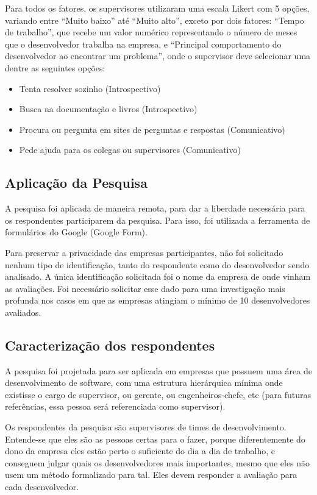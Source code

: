 Para todos os fatores, os supervisores utilizaram uma escala Likert com 5 opções, variando entre ``Muito baixo'' até ``Muito alto'', exceto por dois fatores: ``Tempo de trabalho'', que recebe um valor numérico representando o número de meses que o desenvolvedor trabalha na empresa, e ``Principal comportamento do desenvolvedor ao encontrar um problema'', onde o supervisor deve selecionar uma dentre as seguintes opções:

\begin{itemize}
	\item Tenta resolver sozinho (Introspectivo)
	\item Busca na documentação e livros (Introspectivo)
	\item Procura ou pergunta em sites de perguntas e respostas (Comunicativo)
	\item Pede ajuda para os colegas ou supervisores (Comunicativo)
\end{itemize}

\subsection{Aplicação da Pesquisa}

A pesquisa foi aplicada de maneira remota, para dar a liberdade necessária para os respondentes participarem da pesquisa. Para isso, foi utilizada a ferramenta de formulários do Google (Google Form).

Para preservar a privacidade das empresas participantes, não foi solicitado nenhum tipo de identificação, tanto do respondente como do desenvolvedor sendo analisado. A única identificação solicitada foi o nome da empresa de onde vinham as avaliações. Foi necessário solicitar esse dado para uma investigação mais profunda nos casos em que as empresas atingiam o mínimo de 10 desenvolvedores avaliados.

\subsection{Caracterização dos respondentes}\label{caracterizacao_respondentes}

A pesquisa foi projetada para ser aplicada em empresas que possuem uma área de desenvolvimento de software, com uma estrutura hierárquica mínima onde existisse o cargo de supervisor, ou gerente, ou engenheiros-chefe, etc (para futuras referências, essa pessoa será referenciada como supervisor).

Os respondentes da pesquisa são supervisores de times de desenvolvimento. Entende-se que eles são as pessoas certas para o fazer, porque diferentemente do dono da empresa eles estão perto o suficiente do dia a dia de trabalho, e conseguem julgar quais os desenvolvedores mais importantes, mesmo que eles não usem um método formalizado para tal. Eles devem responder a avaliação para cada desenvolvedor.

